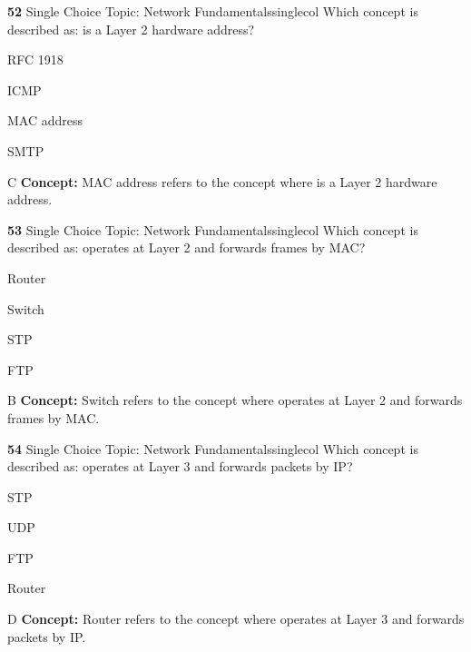 \documentclass[10pt,a4paper]{article}
\begin{document}
\begin{qcard}{\color{white}\textbf{52} \hfill \small Single Choice \textbar{} Topic: Network Fundamentals}{singlecol}
Which concept is described as: is a Layer 2 hardware address?

\begin{qoptions}
\item RFC 1918
\item ICMP
\item MAC address
\item SMTP
\end{qoptions}
\begin{explainbox}{C}
\textbf{Concept:} MAC address refers to the concept where is a Layer 2 hardware address.
\end{explainbox}
\end{qcard}

\begin{qcard}{\color{white}\textbf{53} \hfill \small Single Choice \textbar{} Topic: Network Fundamentals}{singlecol}
Which concept is described as: operates at Layer 2 and forwards frames by MAC?

\begin{qoptions}
\item Router
\item Switch
\item STP
\item FTP
\end{qoptions}
\begin{explainbox}{B}
\textbf{Concept:} Switch refers to the concept where operates at Layer 2 and forwards frames by MAC.
\end{explainbox}
\end{qcard}

\begin{qcard}{\color{white}\textbf{54} \hfill \small Single Choice \textbar{} Topic: Network Fundamentals}{singlecol}
Which concept is described as: operates at Layer 3 and forwards packets by IP?

\begin{qoptions}
\item STP
\item UDP
\item FTP
\item Router
\end{qoptions}
\begin{explainbox}{D}
\textbf{Concept:} Router refers to the concept where operates at Layer 3 and forwards packets by IP.
\end{explainbox}
\end{qcard}
\end{document}
